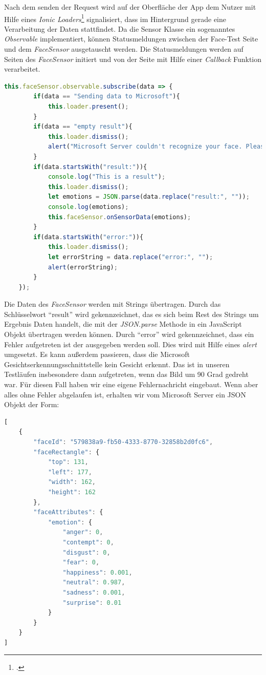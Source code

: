 Nach dem senden der Request wird auf der Oberfläche der App dem Nutzer mit Hilfe eines \textit{Ionic Loaders}\footcite{Ion18f} signalisiert, dass im Hintergrund gerade eine Verarbeitung der Daten stattfindet. Da die Sensor Klasse ein sogenanntes \textit{Observable} implementiert, können Statusmeldungen zwischen der Face-Test Seite und dem \textit{FaceSensor} ausgetauscht werden. Die Statusmeldungen werden auf Seiten des \textit{FaceSensor} initiert und von der Seite mit Hilfe einer \textit{Callback} Funktion verarbeitet. \newline
\begin{lstlisting}[caption={Callback Methode auf FaceSensor Observable}, language=JavaScript]
	this.faceSensor.observable.subscribe(data => {
		if(data == "Sending data to Microsoft"){
			this.loader.present();
		}
		if(data == "empty result"){
			this.loader.dismiss();
			alert("Microsoft Server couldn't recognize your face. Please make sure your face is visible");
		}
		if(data.startsWith("result:")){
			console.log("This is a result");
			this.loader.dismiss();
			let emotions = JSON.parse(data.replace("result:", ""));
			console.log(emotions);
			this.faceSensor.onSensorData(emotions);
		}
		if(data.startsWith("error:")){
			this.loader.dismiss();
			let errorString = data.replace("error:", "");
			alert(errorString);
		}
	});
\end{lstlisting}
Die Daten des \textit{FaceSensor} werden mit Strings übertragen. Durch das Schlüsselwort ``result'' wird gekennzeichnet, das es sich beim Rest des Strings um Ergebnis Daten handelt, die mit der \textit{JSON.parse} Methode in ein JavaScript Objekt übertragen werden können. Durch ``error'' wird gekennzeichnet, dass ein Fehler aufgetreten ist der ausgegeben werden soll. Dies wird mit Hilfe eines \textit{alert} umgesetzt. Es kann außerdem passieren, dass die Microsoft Gesichtserkennungsschnittstelle kein Gesicht erkennt. Das ist in unseren Testläufen insbesondere dann aufgetreten, wenn das Bild um 90 Grad gedreht war. Für diesen Fall haben wir eine eigene Fehlernachricht eingebaut.\newline
Wenn aber alles ohne Fehler abgelaufen ist, erhalten wir vom Microsoft Server ein JSON Objekt der Form: \newpage
\begin{lstlisting}[caption={Ergebnis Gesichtserkennungsschnittstelle, Beispiel Microsoft}, language=JavaScript]
[
	{
		"faceId": "579838a9-fb50-4333-8770-32858b2d0fc6",
		"faceRectangle": {
			"top": 131,
			"left": 177,
			"width": 162,
			"height": 162
		},
		"faceAttributes": {
			"emotion": {
				"anger": 0,
				"contempt": 0,
				"disgust": 0,
				"fear": 0,
				"happiness": 0.001,
				"neutral": 0.987,
				"sadness": 0.001,
				"surprise": 0.01
			}
		}
	}
]
\end{lstlisting}
